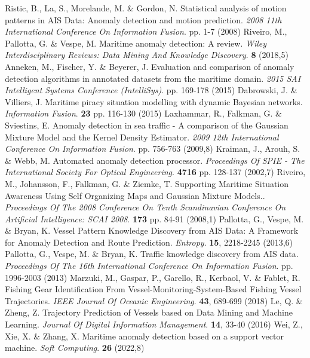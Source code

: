 Ristic, B., La, S., Morelande, M. \& Gordon, N. Statistical analysis of motion patterns in AIS Data: Anomaly detection and motion prediction. {\em 2008 11th International Conference On Information Fusion}. pp. 1-7 (2008)
Riveiro, M., Pallotta, G. \& Vespe, M. Maritime anomaly detection: A review. {\em Wiley Interdisciplinary Reviews: Data Mining And Knowledge Discovery}. \textbf{8} (2018,5)
Anneken, M., Fischer, Y. \& Beyerer, J. Evaluation and comparison of anomaly detection algorithms in annotated datasets from the maritime domain. {\em 2015 SAI Intelligent Systems Conference (IntelliSys)}. pp. 169-178 (2015)
Dabrowski, J. \& Villiers, J. Maritime piracy situation modelling with dynamic Bayesian networks. {\em Information Fusion}. \textbf{23} pp. 116-130 (2015)
Laxhammar, R., Falkman, G. \& Sviestins, E. Anomaly detection in sea traffic - A comparison of the Gaussian Mixture Model and the Kernel Density Estimator. {\em 2009 12th International Conference On Information Fusion}. pp. 756-763 (2009,8)
Kraiman, J., Arouh, S. \& Webb, M. Automated anomaly detection processor. {\em Proceedings Of SPIE - The International Society For Optical Engineering}. \textbf{4716} pp. 128-137 (2002,7)
Riveiro, M., Johansson, F., Falkman, G. \& Ziemke, T. Supporting Maritime Situation Awareness Using Self Organizing Maps and Gaussian Mixture Models.. {\em Proceedings Of The 2008 Conference On Tenth Scandinavian Conference On Artificial Intelligence: SCAI 2008}. \textbf{173} pp. 84-91 (2008,1)
Pallotta, G., Vespe, M. \& Bryan, K. Vessel Pattern Knowledge Discovery from AIS Data: A Framework for Anomaly Detection and Route Prediction. {\em Entropy}. \textbf{15}, 2218-2245 (2013,6)
Pallotta, G., Vespe, M. \& Bryan, K. Traffic knowledge discovery from AIS data. {\em Proceedings Of The 16th International Conference On Information Fusion}. pp. 1996-2003 (2013)
Marzuki, M., Gaspar, P., Garello, R., Kerbaol, V. \& Fablet, R. Fishing Gear Identification From Vessel-Monitoring-System-Based Fishing Vessel Trajectories. {\em IEEE Journal Of Oceanic Engineering}. \textbf{43}, 689-699 (2018)
Le, Q. \& Zheng, Z. Trajectory Prediction of Vessels based on Data Mining and Machine Learning. {\em Journal Of Digital Information Management}. \textbf{14}, 33-40 (2016)
Wei, Z., Xie, X. \& Zhang, X. Maritime anomaly detection based on a support vector machine. {\em Soft Computing}. \textbf{26} (2022,8)
